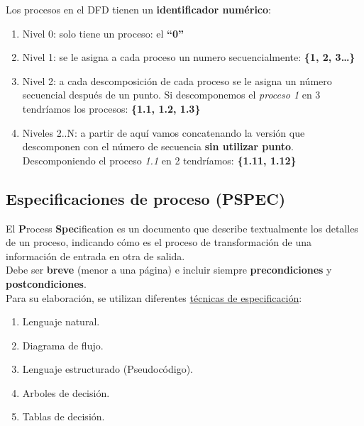 Los procesos en el DFD tienen un \textbf{identificador numérico}:
\begin{enumerate}
    \item Nivel 0: solo tiene un proceso: el \textbf{``0''}
    \item Nivel 1: se le asigna a cada proceso un numero secuencialmente: \textbf{\{1, 2, 3\ldots\}}
    \item Nivel 2: a cada descomposición de cada proceso se le asigna un número secuencial después de un punto. Si descomponemos el \textit{proceso 1} en 3 tendríamos los procesos: \textbf{\{1.1, 1.2, 1.3\}}
    \item Niveles 2..N: a partir de aquí vamos concatenando la versión que descomponen con el número de secuencia \textbf{sin utilizar punto}. Descomponiendo el proceso \textit{1.1} en 2 tendríamos: \textbf{\{1.11, 1.12\}}
\end{enumerate}




\subsection{Especificaciones de proceso (PSPEC)} %
El \textbf{P}rocess \textbf{Spec}ification es un documento que describe textualmente los detalles de un proceso, indicando cómo es el proceso de transformación de una información de entrada en otra de salida.
\\
Debe ser \textbf{breve} (menor a una página) e incluir siempre \textbf{precondiciones} y \textbf{postcondiciones}.
\\
Para su elaboración, se utilizan diferentes \uline{técnicas de especificación}:

\begin{enumerate}
    \item Lenguaje natural.
    \item Diagrama de flujo.
    \item Lenguaje estructurado (Pseudocódigo).
    \item Arboles de decisión.
    \item Tablas de decisión.
\end{enumerate}


